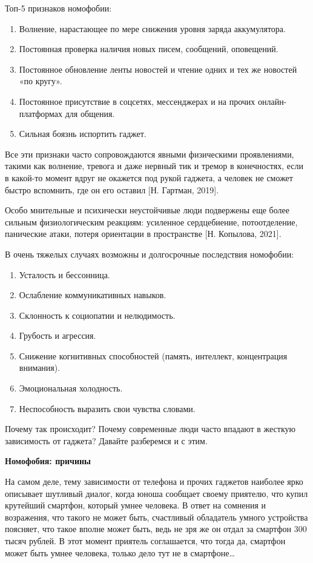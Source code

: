Топ-5 признаков номофобии:

\begin{enumerate}
    \item Волнение, нарастающее по мере снижения уровня заряда аккумулятора.
    \item Постоянная проверка наличия новых писем, сообщений, оповещений.
    \item Постоянное обновление ленты новостей и чтение одних и тех же новостей «по кругу».
    \item Постоянное присутствие в соцсетях, мессенджерах и на прочих онлайн-платформах для общения.
    \item Сильная боязнь испортить гаджет.
\end{enumerate}

Все эти признаки часто сопровождаются явными физическими проявлениями, такими как волнение, тревога и даже нервный тик и тремор в конечностях, если в какой-то момент вдруг не окажется под рукой гаджета, а человек не сможет быстро вспомнить, где он его оставил [Н. Гартман, 2019].

Особо мнительные и психически неустойчивые люди подвержены еще более сильным физиологическим реакциям: усиленное сердцебиение, потоотделение, панические атаки, потеря ориентации в пространстве [Н. Копылова, 2021].

В очень тяжелых случаях возможны и долгосрочные последствия номофобии:
\begin{enumerate}
    \item Усталость и бессонница.
    \item Ослабление коммуникативных навыков.
    \item Склонность к социопатии и нелюдимость.
    \item Грубость и агрессия.
    \item Снижение когнитивных способностей (память, интеллект, концентрация внимания).
    \item Эмоциональная холодность.
    \item Неспособность выразить свои чувства словами.
\end{enumerate}

Почему так происходит? Почему современные люди часто впадают в жесткую зависимость от гаджета? Давайте разберемся и с этим.

\textbf{Номофобия: причины}

На самом деле, тему зависимости от телефона и прочих гаджетов наиболее ярко описывает шутливый диалог, когда юноша сообщает своему приятелю, что купил крутейший смартфон, который умнее человека. В ответ на сомнения и возражения, что такого не может быть, счастливый обладатель умного устройства поясняет, что такое вполне может быть, ведь не зря же он отдал за смартфон 300 тысяч рублей. В этот момент приятель соглашается, что тогда да, смартфон может быть умнее человека, только дело тут не в смартфоне…

